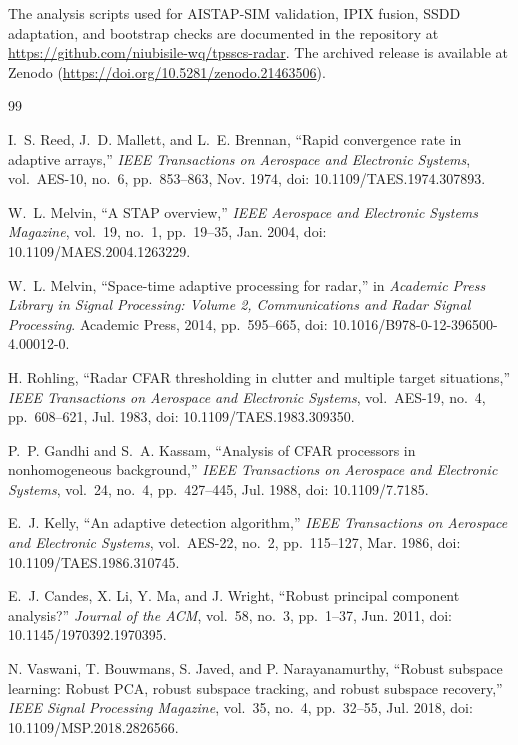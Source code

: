 \documentclass[journal]{IEEEtran}
\begin{document}
The analysis scripts used for AISTAP-SIM validation, IPIX fusion, SSDD adaptation, and bootstrap checks are documented in the repository at \url{https://github.com/niubisile-wq/tpsscs-radar}. The archived release is available at Zenodo (\url{https://doi.org/10.5281/zenodo.21463506}).
\begingroup
\fontsize{7.5}{8.5}\selectfont
\begin{thebibliography}{99}

I.~S. Reed, J.~D. Mallett, and L.~E. Brennan, ``Rapid convergence rate in adaptive arrays,'' \emph{IEEE Transactions on Aerospace and Electronic Systems}, vol.~AES-10, no.~6, pp.~853--863, Nov. 1974, doi: 10.1109/TAES.1974.307893.

W.~L. Melvin, ``A STAP overview,'' \emph{IEEE Aerospace and Electronic Systems Magazine}, vol.~19, no.~1, pp.~19--35, Jan. 2004, doi: 10.1109/MAES.2004.1263229.

W.~L. Melvin, ``Space-time adaptive processing for radar,'' in \emph{Academic Press Library in Signal Processing: Volume 2, Communications and Radar Signal Processing}. Academic Press, 2014, pp.~595--665, doi: 10.1016/B978-0-12-396500-4.00012-0.

H. Rohling, ``Radar CFAR thresholding in clutter and multiple target situations,'' \emph{IEEE Transactions on Aerospace and Electronic Systems}, vol.~AES-19, no.~4, pp.~608--621, Jul. 1983, doi: 10.1109/TAES.1983.309350.

P.~P. Gandhi and S.~A. Kassam, ``Analysis of CFAR processors in nonhomogeneous background,'' \emph{IEEE Transactions on Aerospace and Electronic Systems}, vol.~24, no.~4, pp.~427--445, Jul. 1988, doi: 10.1109/7.7185.

E.~J. Kelly, ``An adaptive detection algorithm,'' \emph{IEEE Transactions on Aerospace and Electronic Systems}, vol.~AES-22, no.~2, pp.~115--127, Mar. 1986, doi: 10.1109/TAES.1986.310745.

E.~J. Candes, X. Li, Y. Ma, and J. Wright, ``Robust principal component analysis?'' \emph{Journal of the ACM}, vol.~58, no.~3, pp.~1--37, Jun. 2011, doi: 10.1145/1970392.1970395.

N. Vaswani, T. Bouwmans, S. Javed, and P. Narayanamurthy, ``Robust subspace learning: Robust PCA, robust subspace tracking, and robust subspace recovery,'' \emph{IEEE Signal Processing Magazine}, vol.~35, no.~4, pp.~32--55, Jul. 2018, doi: 10.1109/MSP.2018.2826566.


\end{thebibliography}
\end{document}
